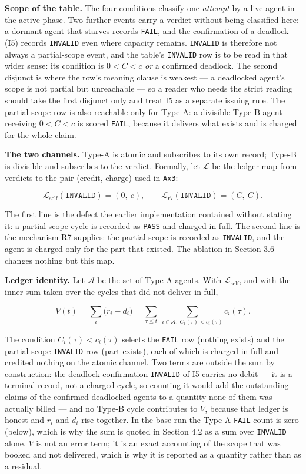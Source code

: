 \documentclass[11pt,a4paper]{article}
\newcounter{none}
\begin{document}
\textbf{Scope of the table.} The four conditions classify one \emph{attempt} by a live
agent in the active phase. Two further events carry a verdict without being
classified here: a dormant agent that starves records \texttt{FAIL}, and the
confirmation of a deadlock (I5) records \texttt{INVALID} even where capacity remains.
\texttt{INVALID} is therefore not always a partial-scope event, and the table's
\texttt{INVALID} row is to be read in that wider sense: its condition is
\(0<C<c\) \emph{or} a confirmed deadlock. The second disjunct is where the row's meaning
clause is weakest --- a deadlocked agent's scope is not partial but unreachable
--- so a reader who needs the strict reading should take the first disjunct only
and treat I5 as a separate issuing rule. The partial-scope
row is also reachable only for Type-A: a divisible Type-B agent receiving
\(0<C<c\) is scored \texttt{FAIL}, because it delivers what exists and is charged for the
whole claim.

\textbf{The two channels.} Type-A is atomic and subscribes to its own record; Type-B
is divisible and subscribes to the verdict. Formally, let \(\mathcal{L}\) be the
ledger map from verdicts to the pair (credit, charge) used in \texttt{Ax3}:

\[
\mathcal{L}_{\mathrm{self}}(\texttt{INVALID})=(0,\ c),
\qquad
\mathcal{L}_{\mathrm{r7}}(\texttt{INVALID})=(C,\ C).
\]

The first line is the defect the earlier implementation contained without
stating it: a partial-scope cycle is recorded as \texttt{PASS} and charged in full. The
second line is the mechanism R7 supplies: the partial scope is recorded as
\texttt{INVALID}, and the agent is charged only for the part that existed. The ablation
in Section 3.6 changes nothing but this map.

\textbf{Ledger identity.} Let \(\mathcal{A}\) be the set of Type-A agents. With
\(\mathcal{L}_{\mathrm{self}}\), and with the inner sum taken over the cycles that
did not deliver in full,

\[
V(t)=\sum_{i}\big(r_i-d_i\big)
=\sum_{\tau\le t}\ \sum_{i\in\mathcal{A}:\ C_i(\tau)<c_i(\tau)} c_i(\tau).
\]

The condition \(C_i(\tau)<c_i(\tau)\) selects the \texttt{FAIL} row (nothing exists) and
the partial-scope \texttt{INVALID} row (part exists), each of which is charged in full
and credited nothing on the atomic channel. Two terms are outside the sum by
construction: the deadlock-confirmation \texttt{INVALID} of I5 carries no debit --- it is
a terminal record, not a charged cycle, so counting it would add the outstanding
claims of the confirmed-deadlocked agents to a quantity none of them was
actually billed --- and no Type-B cycle contributes to \(V\), because that ledger
is honest and \(r_i\) and \(d_i\) rise together. In the base run the Type-A \texttt{FAIL}
count is zero (below), which is why the sum is quoted in Section 4.2 as a sum
over \texttt{INVALID} alone. \(V\) is not an error term; it is an exact accounting of the
scope that was booked and not delivered, which is why it is reported as a
quantity rather than as a residual.
\end{document}
